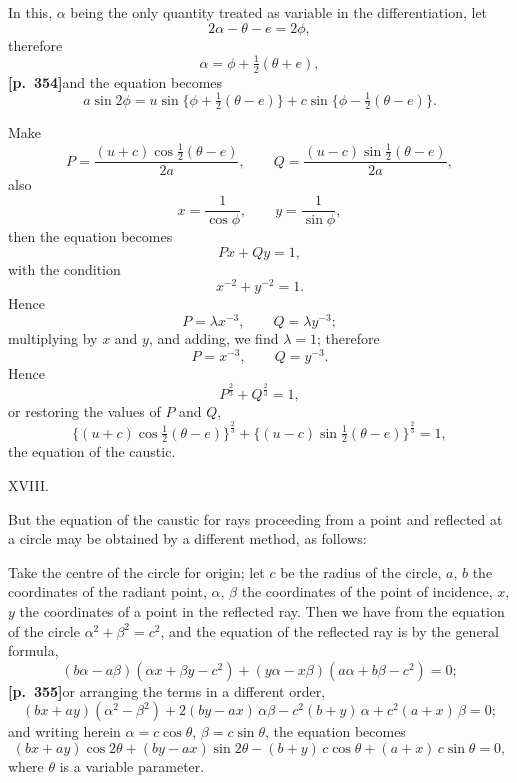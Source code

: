 \documentclass[11pt]{article}
\begin{document}
In this, $\alpha$ being the only quantity treated as variable in the differentiation, let
\[
2\alpha - \theta - e = 2\phi,
\]
therefore
\[
\alpha = \phi + \tfrac{1}{2}(\theta + e),
\]
\textbf{[p.~354]}\quad and the equation becomes
\[
a\sin 2\phi = u\sin\bigl\{\phi + \tfrac{1}{2}(\theta - e)\bigr\} + c\sin\bigl\{\phi - \tfrac{1}{2}(\theta - e)\bigr\}.
\]

Make
\[
P = \frac{(u + c)\cos\tfrac{1}{2}(\theta - e)}{2a},\qquad Q = \frac{(u - c)\sin\tfrac{1}{2}(\theta - e)}{2a},
\]
also
\[
x = \frac{1}{\cos\phi},\qquad y = \frac{1}{\sin\phi},
\]
then the equation becomes
\[
Px + Qy = 1,
\]
with the condition
\[
x^{-2} + y^{-2} = 1.
\]
Hence
\[
P = \lambda x^{-3},\qquad Q = \lambda y^{-3};
\]
multiplying by $x$ and $y$, and adding, we find $\lambda = 1$; therefore
\[
P = x^{-3},\qquad Q = y^{-3}.
\]
Hence
\[
P^{\tfrac{2}{3}} + Q^{\tfrac{2}{3}} = 1,
\]
or restoring the values of $P$ and $Q$,
\[
\bigl\{(u + c)\cos\tfrac{1}{2}(\theta - e)\bigr\}^{\tfrac{2}{3}} + \bigl\{(u - c)\sin\tfrac{1}{2}(\theta - e)\bigr\}^{\tfrac{2}{3}} = 1,
\]
the equation of the caustic.

\medskip
\begin{center}XVIII.\end{center}

But the equation of the caustic for rays proceeding from a point and reflected at a circle may be obtained by a different method, as follows:

Take the centre of the circle for origin; let $c$ be the radius of the circle, $a$, $b$ the coordinates of the radiant point, $\alpha$, $\beta$ the coordinates of the point of incidence, $x$, $y$ the coordinates of a point in the reflected ray. Then we have from the equation of the circle $\alpha^{2} + \beta^{2} = c^{2}$, and the equation of the reflected ray is by the general formula,
\[
(b\alpha - a\beta)(\alpha x + \beta y - c^{2}) + (y\alpha - x\beta)(a\alpha + b\beta - c^{2}) = 0;
\]
\textbf{[p.~355]}\quad or arranging the terms in a different order,
\[
(bx + ay)(\alpha^{2} - \beta^{2}) + 2(by - ax)\,\alpha\beta - c^{2}(b + y)\,\alpha + c^{2}(a + x)\,\beta = 0;
\]
and writing herein $\alpha = c\cos\theta$, $\beta = c\sin\theta$, the equation becomes
\[
(bx + ay)\cos 2\theta + (by - ax)\sin 2\theta - (b + y)\,c\cos\theta + (a + x)\,c\sin\theta = 0,
\]
where $\theta$ is a variable parameter.
\end{document}
